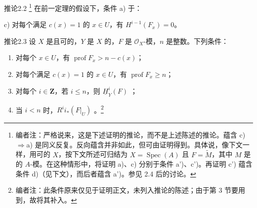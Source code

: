\begin{SGAresult}{推论}{2.2}
\footnote{编者注：严格说来，这是下述证明的推论，而不是上述陈述的推论。蕴含 c)$\Rightarrow$a) 是同义反复。反向蕴含并非如此，但可由证明得到。具体说，像下文一样，用可的 $X$，按下文所述可归结为 $X=\operatorname{Spec}(A)$ 且 $F=\widetilde M$，其中 $M$ 是的 $A$-模。在这种情形中，将证明 a)、c) 分别于条件 a')、c')。再证明 c') 蕴含条件 d)（见下文），而后者蕴含 a')。参见 2.4 后的讨论。}
在前一定理的假设下，条件 a) 于：

 c) 对每个满足 $c(x)=1$ 的 $x\in U$，有 $H^{i-1}(F_x)=0$。
\end{SGAresult}
\begin{SGAresult}{推论}{2.3}
设 $X$ 是且可的，$Y$ 是 $X$ 的，$F$ 是 $\mathscr O_X$-模，$n$ 是整数。下列条件：
\begin{enumerate}
\item[(i)] 对每个 $x\in U$，有 $\operatorname{prof}F_x>n-c(x)$；
\item[(ii)] 对每个满足 $c(x)=1$ 的 $x\in U$，有 $\operatorname{prof}F_x\geq n$；
\item[(iii)] 对每个 $i\in\mathbf Z$，若 $i\leq n$，则 $\underline H^i_Y(F)$ ；
\item[(iv)] 当 $i<n$ 时，$R^ii_*(F|_U)$ 。\footnote{编者注：此条件原来仅见于证明正文，未列入推论的陈述；由于第 3 节要用到，故将其补入。}
\end{enumerate}
\end{SGAresult}
